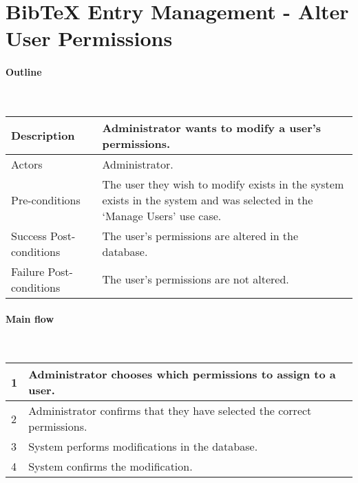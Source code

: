 \section*{BibTeX Entry Management - Alter User Permissions} %

\paragraph*{Outline} \

\begin{tabular}{ | l | l | }
\hline
Description & Administrator wants to modify a user's permissions. \\ \hline
Actors & Administrator. \\ \hline
Pre-conditions & The user they wish to modify exists in the system exists in the system and was selected in the `Manage Users' use case. \\ \hline
Success Post-conditions & The user's permissions are altered in the database. \\ \hline
Failure Post-conditions & The user's permissions are not altered. \\ \hline
\end{tabular}


\paragraph*{Main flow} \

\begin{tabular}{ | l | l | } \hline
1 & Administrator chooses which permissions to assign to a user. \\ \hline
2 & Administrator confirms that they have selected the correct permissions. \\ \hline
3 & System performs modifications in the database. \\ \hline
4 & System confirms the modification. \\ \hline
\end{tabular}